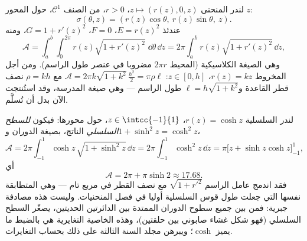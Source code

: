 \begin{example}\label{ex:b2:surfaces:revolution}
لندر المنحنى $z \mapsto (r(z), 0, z)$، $r > 0$، من الصنف $\mathcal{C}^1$، حول المحور $z$:
\[
\sigma(\theta, z) = (r(z)\cos\theta,\ r(z)\sin\theta,\ z).
\]
عندئذ $E = r(z)^2$، $F = 0$، $G = 1 + r'(z)^2$، ومنه
\[
\mathcal{A} = \int_a^b\!\!\int_0^{2\pi}
r(z)\sqrt{1 + r'(z)^2}\;\dd\theta\,\dd z
= 2\pi\int_a^b r(z)\sqrt{1 + r'(z)^2}\,\dd z ,
\]
وهي الصيغة الكلاسيكية (المحيط $2\pi r$ مضروبا في عنصر طول الراسم).
ومن أجل المخروط $r(z) = kz$، $z \in [0, h]$: $\mathcal
A = 2\pi k\sqrt{1 + k^2}\,\frac{h^2}{2} = \pi \rho \ell$ مع $\rho = kh$ نصف قطر القاعدة
و$\ell = h\sqrt{1 + k^2}$ طول الراسم --- وهي صيغة المدرسة، وقد استُنتجت الآن بدل أن
تُسلَّم.
\end{example}

\begin{example}\label{ex:b2:surfaces:catenoid}
لندر السلسلية $r(z) = \cosh z$، $z \in \intcc{-1}{1}$، حول محورها: فيكون \emph{للسطح
السلسلي} الناتج، بصيغة الدوران و$1 + \sinh^2 z = \cosh^2 z$،
\[
\mathcal A = 2\pi\int_{-1}^1\cosh z\,\sqrt{1 + \sinh^2z}\,
\dd z = 2\pi\int_{-1}^1\cosh^2z\,\dd z
= \pi\bigl[z + \sinh z\cosh z\bigr]_{-1}^{1},
\]
أي
\[
\mathcal A = 2\pi + \pi\sinh 2 \approx 17.68 .
\]
فقد اندمج عامل الراسم $\sqrt{1 + r'^2}$ مع نصف القطر في مربع تام --- وهي
المتطابقة نفسها التي جعلت طول قوس السلسلية أوليا في فصل المنحنيات.
وليست هذه مصادفة جبرية: فمن بين جميع سطوح الدوران الممتدة بين
الدائرتين الحديتين، يصغّر السطح السلسلي  (فهو شكل غشاء صابوني
بين حلقتين)، وهذه الخاصية التغايرية هي بالضبط ما يميز $\cosh$؛
ويبرهن مجلد السنة الثالثة على ذلك بحساب التغايرات.
\end{example}

